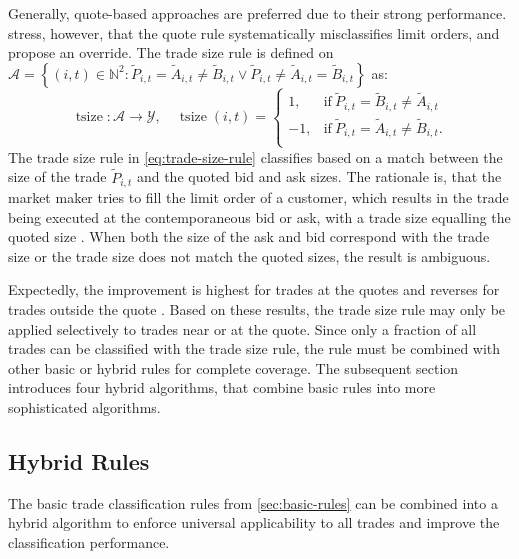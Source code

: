 Generally, quote-based approaches are preferred due to their strong performance. \textcite[][13]{grauerOptionTradeClassification2022} stress, however, that the quote rule systematically misclassifies limit orders, and propose an override. The trade size rule is defined on $\mathcal{A} = \left\{(i, t) \in \mathbb{N}^2: \tilde{P}_{i,t} = \tilde{A}_{i,t} \neq \tilde{B}_{i,t} \lor \tilde{P}_{i,t} \neq\tilde{A}_{i,t} = \tilde{B}_{i,t} \right\}$ as:
\begin{equation}
    \operatorname{tsize} \colon \mathcal{A} \to \mathcal{Y},\quad
    \operatorname{tsize}(i, t)=
    \begin{cases}
        1,  & \mathrm{if}\ \tilde{P}_{i, t} = \tilde{B}_{i, t} \neq \tilde{A}_{i, t}  \\
        -1, & \mathrm{if}\ \tilde{P}_{i, t} = \tilde{A}_{i, t} \neq \tilde{B}_{i, t}. \\
    \end{cases}
    \label{eq:trade-size-rule}
\end{equation}
The trade size rule in \cref{eq:trade-size-rule} classifies based on a match between the size of the trade $\tilde{P}_{i, t}$ and the quoted bid and ask sizes. The rationale is, that the market maker tries to fill the limit order of a customer, which results in the trade being executed at the contemporaneous bid or ask, with a trade size equalling the quoted size \autocite[][13]{grauerOptionTradeClassification2022}. When both the size of the ask and bid correspond with the trade size or the trade size does not match the quoted sizes, the result is ambiguous.

Expectedly, the improvement is highest for trades at the quotes and reverses for trades outside the quote \autocite[][15]{grauerOptionTradeClassification2022}. Based on these results, the trade size rule may only be applied selectively to trades near or at the quote. Since only a fraction of all trades can be classified with the trade size rule, the rule must be combined with other basic or hybrid rules for complete coverage. The subsequent section introduces four hybrid algorithms, that combine basic rules into more sophisticated algorithms.

\subsection{Hybrid Rules}\label{sec:hybrid-rules}

The basic trade classification rules from \cref{sec:basic-rules} can be combined into a hybrid algorithm to enforce universal applicability to all trades and improve the classification performance.

